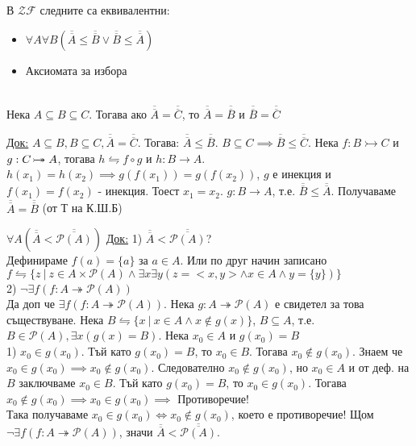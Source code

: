 \documentclass[fleqn, titlepage, 12pt]{report}
\newcommand*\rightbijectionarrow{\mathrel{\ooalign{
  $\twoheadrightarrow$\cr\hidewidth\hbox{$\rightarrowtail\mkern 1mu$}\cr }}}
\begin{document}
 В $\mathcal{ZF}$ следните са еквивалентни:
\begin{itemize}
  \item $\forall{A}\forall{B}(\overline{\overline{A}} \leq \overline{\overline{B}}
    \lor \overline{\overline{B}} \leq \overline{\overline{A}})$
  \item Аксиомата за избора
\end{itemize}
\bigbreak

\\
Нека $A \subseteq B \subseteq C$. Тогава ако $\overline{\overline{A}} = \overline{\overline{C}}$, то
$\overline{\overline{A}} = \overline{\overline{B}}$ и $\overline{\overline{B}} = \overline{\overline{C}}$
\bigbreak

\underline{Док:} $A \subseteq B, B \subseteq C, \overline{\overline{A}} = \overline{\overline{C}}$.
Тогава:
$\overline{\overline{A}} \leq \overline{\overline{B}}$.
$B \subseteq C \implies \overline{\overline{B}} \leq \overline{\overline{C}}$.
Нека $f: B \rightarrowtail C$ и $g: C \rightbijectionarrow A$, тогава $h \leftrightharpoons f \circ g$
и $h: B \rightarrow A $. $h(x_1) = h(x_2) \implies g(f(x_1)) = g(f(x_2))$,
$g$ е инекция и $f(x_1) = f(x_2)$ - инекция. Тоест $x_1 = x_2$. $g: B \rightarrow A$, т.е.
$\overline{\overline{B}} \leq \overline{\overline{A}}$. Получаваме
$\overline{\overline{A}} = \overline{\overline{B}}$ (от Т на К.Ш.Б)
\bigbreak

 $\forall{A}(\overline{\overline{A}} < \overline{\overline{\mathcal{P}(A)}})$
\bigbreak
\underline{Док:} 1) $\overline{\overline{A}} < \overline{\overline{\mathcal{P}(A)}}$?\\
Дефинираме $f(a) = \{ a \}$ за $a \in A$. Или по друг начин записано
$f \leftrightharpoons \{z\ |\ z \in A \times \mathcal{P}(A)
\land \exists{x}\exists{y}(z = <x,y> \land x \in A \land y = \{ y \})\}$\\
2) $\lnot \exists{f}(f: A \twoheadrightarrow \mathcal{P}(A))$\\
Да доп че $\exists{f}(f: A \twoheadrightarrow \mathcal{P}(A))$. Нека $g: A \twoheadrightarrow \mathcal{P}(A)$
е свидетел за това съществуване. Нека $B \leftrightharpoons \{x\ |\ x \in A \land x \notin g(x)\}$,
$B \subseteq A$, т.е. $B \in \mathcal{P}(A), \exists{x}(g(x) = B)$. Нека $x_0 \in A$ и $g(x_0) = B$\\
1) $x_0 \in g(x_0)$. Тъй като $g(x_0) = B$, то $x_0 \in B$. Тогава $x_0 \notin g(x_0)$.
Знаем че $x_0 \in g(x_0) \implies x_0 \notin g(x_0)$.
Следователно $x_0 \notin g(x_0)$, но $x_0 \in A$ и от деф. на $B$ заключваме $x_0 \in B$. Тъй като $g(x_0) = B$,
то $x_0 \in g(x_0)$. Тогава $x_0 \notin g(x_0) \implies x_0 \in g(x_0) \implies$ Противоречие!\\
Така получаваме $x_0 \in g(x_0) \Longleftrightarrow x_0 \notin g(x_0)$, което е противоречие!
\bigbreak
Щом $\lnot \exists{f}(f: A \twoheadrightarrow \mathcal{P}(A))$,
значи $\overline{\overline{A}} < \overline{\overline{\mathcal{P}(A)}}$.
\bigbreak
\end{document}
